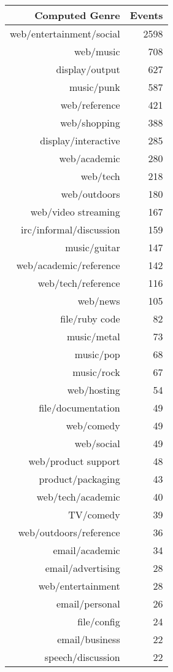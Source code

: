 \begin{table}[ht]
\centering
\begin{tabular}{rr}
  \hline
  Computed Genre & Events \\ 
  \hline
  web/entertainment/social & 2598 \\ 
  web/music & 708 \\ 
  display/output & 627 \\ 
  music/punk & 587 \\ 
  web/reference & 421 \\ 
  web/shopping & 388 \\ 
  display/interactive & 285 \\ 
  web/academic & 280 \\ 
  web/tech & 218 \\ 
  web/outdoors & 180 \\ 
  web/video streaming & 167 \\ 
  irc/informal/discussion & 159 \\ 
  music/guitar & 147 \\ 
  web/academic/reference & 142 \\ 
  web/tech/reference & 116 \\ 
  web/news & 105 \\ 
  file/ruby code &  82 \\ 
  music/metal &  73 \\ 
  music/pop &  68 \\ 
  music/rock &  67 \\ 
  web/hosting &  54 \\ 
  file/documentation &  49 \\ 
  web/comedy &  49 \\ 
  web/social &  49 \\ 
  web/product support &  48 \\ 
  product/packaging &  43 \\ 
  web/tech/academic &  40 \\ 
  TV/comedy &  39 \\ 
  web/outdoors/reference &  36 \\ 
  email/academic &  34 \\ 
  email/advertising &  28 \\ 
  web/entertainment &  28 \\ 
  email/personal &  26 \\ 
  file/config &  24 \\ 
  email/business &  22 \\ 
  speech/discussion &  22 \\ 

\end{tabular}
\end{table}
